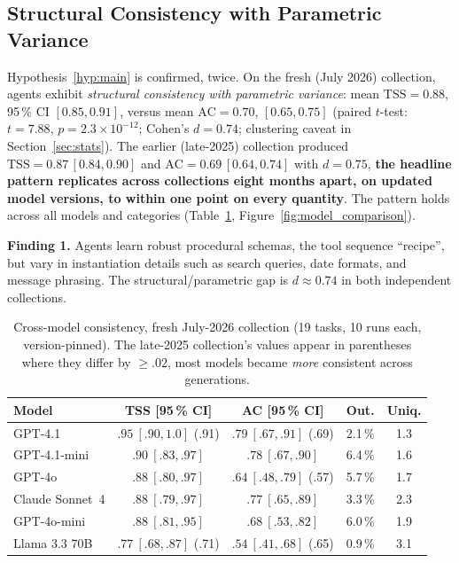 \documentclass[11pt]{article}
\newcommand{\tss}{\mathrm{TSS}}
\newcommand{\ac}{\mathrm{AC}}
\newcommand{\finding}[1]{%
  \begin{mdframed}[backgroundcolor=gray!9,linewidth=0.4pt,innertopmargin=4pt,
                   innerbottommargin=4pt]
    \small #1
  \end{mdframed}}
\begin{document}
\subsection{Structural Consistency with Parametric Variance}
\label{sec:structural}

Hypothesis~\ref{hyp:main} is confirmed, twice. On the fresh (July 2026)
collection, agents exhibit \emph{structural consistency with parametric
variance}: mean $\tss = 0.88$, 95\,\% CI $[0.85, 0.91]$, versus mean
$\ac = 0.70$, $[0.65, 0.75]$ (paired $t$-test: $t = 7.88$,
$p = 2.3\times10^{-12}$; Cohen's $d = 0.74$; clustering caveat in
Section~\ref{sec:stats}). The earlier (late-2025) collection produced
$\tss = 0.87\,[0.84, 0.90]$ and $\ac = 0.69\,[0.64, 0.74]$ with $d = 0.75$,
\textbf{the headline pattern replicates across collections eight months
apart, on updated model versions, to within one point on every quantity}. The
pattern holds across all models and categories
(Table~\ref{tab:model_comparison}, Figure~\ref{fig:model_comparison}).

\finding{\textbf{Finding 1.} Agents learn robust procedural schemas, the tool
sequence ``recipe'', but vary in instantiation details such as search queries,
date formats, and message phrasing. The structural/parametric gap is
$d \approx 0.74$ in both independent collections.}

\begin{table}[t]
\centering
\caption{Cross-model consistency, fresh July-2026 collection (19 tasks, 10
runs each, version-pinned). The late-2025 collection's values appear in
parentheses where they differ by $\geq.02$, most models became \emph{more}
consistent across generations.}
\label{tab:model_comparison}
\small
\setlength{\tabcolsep}{4pt}
\begin{tabular}{@{}lcccc@{}}
\toprule
Model & TSS [95\,\% CI] & AC [95\,\% CI] & Out. & Uniq. \\
\midrule
GPT-4.1          & $.95\ [.90, 1.0]$ (.91) & $.79\ [.67, .91]$ (.69) & 2.1\,\% & 1.3 \\
GPT-4.1-mini     & $.90\ [.83, .97]$ & $.78\ [.67, .90]$ & 6.4\,\% & 1.6 \\
GPT-4o           & $.88\ [.80, .97]$ & $.64\ [.48, .79]$ (.57) & 5.7\,\% & 1.7 \\
Claude Sonnet~4  & $.88\ [.79, .97]$ & $.77\ [.65, .89]$ & 3.3\,\% & 2.3 \\
GPT-4o-mini      & $.88\ [.81, .95]$ & $.68\ [.53, .82]$ & 6.0\,\% & 1.9 \\
Llama 3.3 70B    & $.77\ [.68, .87]$ (.71) & $.54\ [.41, .68]$ (.65) & 0.9\,\% & 3.1 \\
\bottomrule
\end{tabular}
\end{table}
\end{document}
